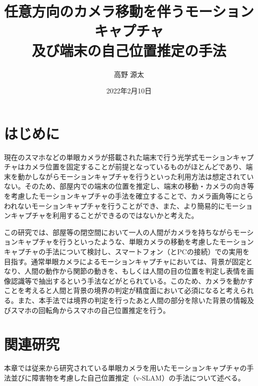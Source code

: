 \documentclass[11pt]{jreport}
\title{任意方向のカメラ移動を伴うモーションキャプチャ \\
        及び端末の自己位置推定の手法}
\author{高野 源太}
\date{2022年2月10日}	%
\begin{document}
\maketitle

\begin{abstract}


\end{abstract}

\tableofcontents



\newpage
{}	%



\chapter{はじめに}
現在のスマホなどの単眼カメラが搭載された端末で行う光学式モーションキャプチャはカメラ位置を固定することが前提となっているものがほとんどであり、端末を動かしながらモーションキャプチャを行うといった利用方法は想定されていない。そのため、部屋内での端末の位置を推定し、端末の移動・カメラの向き等を考慮したモーションキャプチャの手法を確立することで、カメラ画角等にとらわれないモーションキャプチャを行うことができ、また、より簡易的にモーションキャプチャを利用することができるのではないかと考えた。

この研究では、部屋等の閉空間において一人の人間がカメラを持ちながらモーションキャプチャを行うといったような、単眼カメラの移動を考慮したモーションキャプチャの手法について検討し、スマートフォン（とPCの接続）での実用を目指す。通常単眼カメラによるモーションキャプチャにおいては、背景が固定となり、人間の動作から関節の動きを、もしくは人間の目の位置を判定し表情を画像認識等で抽出するという手法などがとられている。このため、カメラを動かすことを考えると人間と背景の境界の判定が精度面において必須になると考えられる。また、本手法では境界の判定を行ったあと人間の部分を除いた背景の情報及びスマホの回転角からスマホの自己位置推定を行う。

\chapter{関連研究}
本章では従来から研究されている単眼カメラを用いたモーションキャプチャの手法並びに障害物を考慮した自己位置推定（v-SLAM）の手法について述べる。
\end{document}

